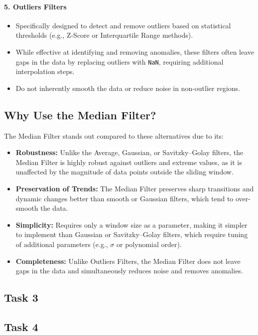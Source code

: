 \documentclass[12pt]{article}
\begin{document}
\paragraph{5. Outliers Filters}
\begin{itemize}
    \item Specifically designed to detect and remove outliers based on statistical thresholds (e.g., Z-Score or Interquartile Range methods).
    \item While effective at identifying and removing anomalies, these filters often leave gaps in the data by replacing outliers with \texttt{NaN}, requiring additional interpolation steps.
    \item Do not inherently smooth the data or reduce noise in non-outlier regions.
\end{itemize}

\subsection*{Why Use the Median Filter?}
The Median Filter stands out compared to these alternatives due to its:
\begin{itemize}
    \item \textbf{Robustness:} Unlike the Average, Gaussian, or Savitzky–Golay filters, the Median Filter is highly robust against outliers and extreme values, as it is unaffected by the magnitude of data points outside the sliding window.
    \item \textbf{Preservation of Trends:} The Median Filter preserves sharp transitions and dynamic changes better than smooth or Gaussian filters, which tend to over-smooth the data.
    \item \textbf{Simplicity:} Requires only a window size as a parameter, making it simpler to implement than Gaussian or Savitzky–Golay filters, which require tuning of additional parameters (e.g., \(\sigma\) or polynomial order).
    \item \textbf{Completeness:} Unlike Outliers Filters, the Median Filter does not leave gaps in the data and simultaneously reduces noise and removes anomalies.
\end{itemize}


\subsection{Task 3}


\subsection{Task 4}
\end{document}

